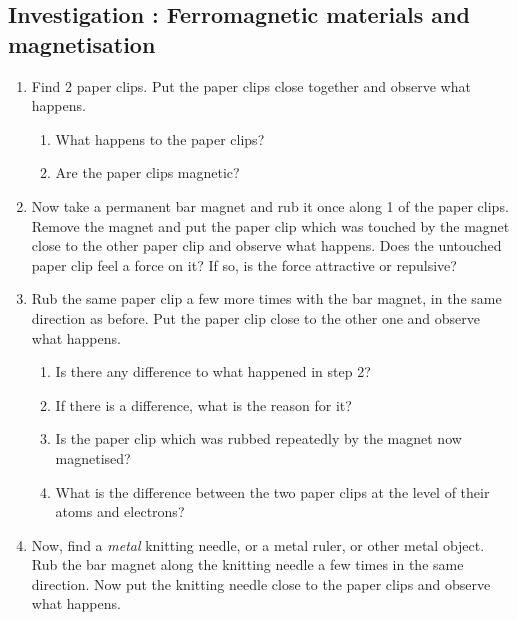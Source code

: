     \addtocounter{footnote}{-0}
    
      \par 
\label{m37830*secfhsst!!!underscore!!!id122}
            \subsection{  Investigation : Ferromagnetic materials and magnetisation }
            \nopagebreak
            
      \label{m37830*id128416}\begin{enumerate}[noitemsep, label=\textbf{\arabic*}. ] 
            \label{m37830*uid1}\item Find 2 paper clips. Put the paper clips close together and observe what happens.
\label{m37830*id128431}\begin{enumerate}[noitemsep, label=\textbf{\alph*}. ] 
            \label{m37830*uid2}\item What happens to the paper clips?\label{m37830*uid3}\item Are the paper clips magnetic?\end{enumerate}
        \label{m37830*uid4}\item Now take a permanent bar magnet and rub it once along 1 of the paper clips. Remove the magnet and put the paper clip which was touched by the magnet close to the other paper clip and observe what happens. Does the untouched paper clip feel a force on it? If so, is the force attractive or repulsive?\label{m37830*uid6}\item Rub the same paper clip a few more times with the bar magnet, in the same direction as before. Put the paper clip close to the other one and observe what happens.
\label{m37830*id128510}\begin{enumerate}[noitemsep, label=\textbf{\alph*}. ] 
            \label{m37830*uid7}\item Is there any difference to what happened in step 2?\label{m37830*uid8}\item If there is a difference, what is the reason for it?\label{m37830*uid9}\item Is the paper clip which was rubbed repeatedly by the magnet now magnetised?\label{m37830*uid10}\item What is the difference between the two paper clips at the level of their atoms and electrons?\end{enumerate}
        \label{m37830*uid11}\item Now, find a \textsl{metal} knitting needle, or a metal ruler, or other metal object. Rub the bar magnet along the knitting needle a few times in the same direction. Now put the knitting needle close to the paper clips and observe what happens.

\end{enumerate}
